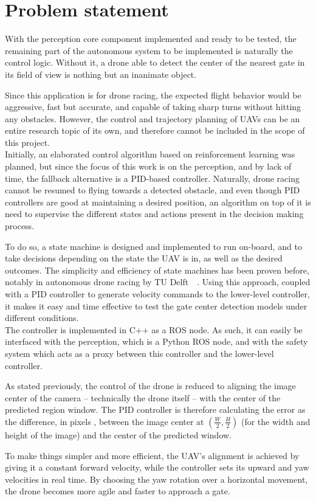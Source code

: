 \section{Problem statement}

With the perception core component implemented and ready to be tested, the
remaining part of the autonomous system to be implemented is naturally the
control logic. Without it, a drone able to detect the center of the nearest
gate in its field of view is nothing but an inanimate object.

Since this application is for drone racing, the expected flight behavior would
be aggressive, fast but accurate, and capable of taking sharp turns without
hitting any obstacles. However, the control and trajectory planning of UAVs can
be an entire research topic of its own, and therefore cannot be included in the
scope of this project.\\

Initially, an elaborated control algorithm based on reinforcement learning was
planned, but since the focus of this work is on the perception, and by lack of
time, the fallback alternative is a PID-based controller. Naturally, drone
racing cannot be resumed to flying towards a detected obstacle, and even though
PID controllers are good at maintaining a desired position, an algorithm on top
of it is need to supervise the different states and actions present in the
decision making process.

To do so, a state machine is designed and implemented to run on-board, and to
take decisions depending on the state the UAV is in, as well as the desired
outcomes. The simplicity and efficiency of state machines has been proven
before, notably in autonomous drone racing by TU Delft~\etal~\cite{State
Machine based High Level Navigation}. 
Using this approach, coupled with a PID controller to generate velocity
commands to the lower-level controller, it makes it easy and time effective to
test the gate center detection models under different conditions.\\

The controller is implemented in C++ as a ROS node. As such, it can easily be
interfaced with the perception, which is a Python ROS node, and with the safety
system which acts as a proxy between this controller and the lower-level
controller.

As stated previously, the control of the drone is reduced to aligning the image
center of the camera -- technically the drone itself -- with the center of the
predicted region window. The PID controller is therefore calculating the error
as the difference, in pixels , between the image center at $(\frac{W}{2},
\frac{H}{2})$ (for the width and height of the image) and the center of the
predicted window.

To make things simpler and more efficient, the UAV's alignment is achieved by
giving it a constant forward velocity, while the controller sets its upward and
yaw velocities in real time. By choosing the yaw rotation over a horizontal
movement, the drone becomes more agile and faster to approach a gate.
